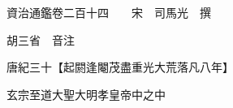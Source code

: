 










 


 
 


 

  
  
  
  
  





  
  
  
  
  
 
  

  

  
  
  



  

 
 

  
   




  

  
  


  　　資治通鑑卷二百十四　　宋　司馬光　撰

　　胡三省　音注

　　唐紀三十【起閼逢閹茂盡重光大荒落凡八年】

　　玄宗至道大聖大明孝皇帝中之中

